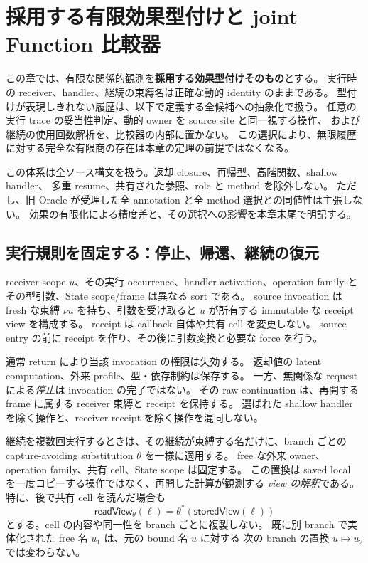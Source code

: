 \documentclass[11pt,a4paper]{article}
\theoremstyle{remark}
\begin{document}


\section{採用する有限効果型付けと joint Function 比較器}
\label{sec:closed-finite-effects}

この章では、有限な関係的観測を\textbf{採用する効果型付けそのもの}とする。
実行時の receiver、handler、継続の束縛名は正確な動的 identity のままである。
型付けが表現しきれない履歴は、以下で定義する全候補への抽象化で扱う。
任意の実行 trace の妥当性判定、動的 owner を source site と同一視する操作、
および継続の使用回数解析を、比較器の内部に置かない。
この選択により、無限履歴に対する完全な有限商の存在は本章の定理の前提ではなくなる。

この体系は全ソース構文を扱う。返却 closure、再帰型、高階関数、shallow handler、
多重 resume、共有された参照、role と method を除外しない。
ただし、旧 Oracle が受理した全 annotation と全 method 選択との同値性は主張しない。
効果の有限化による精度差と、その選択への影響を本章末尾で明記する。

\subsection{実行規則を固定する：停止、帰還、継続の復元}

receiver scope $u$、その実行 occurrence、handler activation、operation family と
その型引数、State scope/frame は異なる sort である。
source invocation は fresh な束縛 $\nu u$ を持ち、引数を受け取ると
$u$ が所有する immutable な receipt view を構成する。
receipt は callback 自体や共有 cell を変更しない。
source entry の前に receipt を作り、その後に引数変換と必要な force を行う。

通常 return により当該 invocation の権限は失効する。
返却値の latent computation、外来 profile、型・依存制約は保存する。
一方、無関係な request による\emph{停止}は invocation の完了ではない。
その raw continuation は、再開する frame に属する receiver 束縛と receipt を保持する。
選ばれた shallow handler を除く操作と、receiver receipt を除く操作を混同しない。

継続を複数回実行するときは、その継続が束縛する名だけに、branch ごとの
capture-avoiding substitution $\theta$ を一様に適用する。
free な外来 owner、operation family、共有 cell、State scope は固定する。
この置換は saved local を一度コピーする操作ではなく、再開した計算が観測する
\emph{view の解釈}である。特に、後で共有 cell を読んだ場合も
\[
  \mathsf{readView}_{\theta}(\ell)
    =\theta^{*}(\mathsf{storedView}(\ell))
\]
とする。cell の内容や同一性を branch ごとに複製しない。
既に別 branch で実体化された free 名 $u_1$ は、元の bound 名 $u$ に対する
次の branch の置換 $u\mapsto u_2$ では変わらない。
\end{document}
